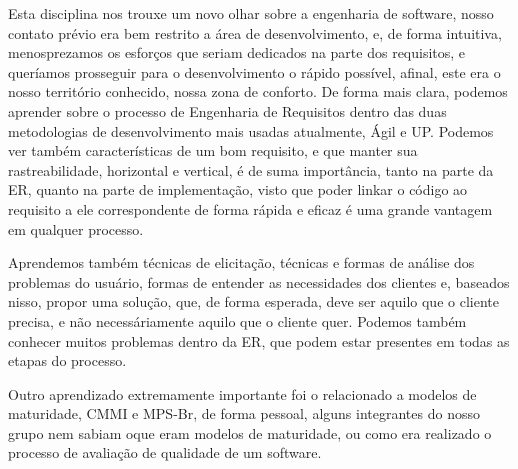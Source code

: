 Esta disciplina nos trouxe um novo olhar sobre a engenharia de software,
nosso contato prévio era bem restrito a área de desenvolvimento, e, de forma intuitiva, menosprezamos os esforços
que seriam dedicados na parte dos requisitos, e queríamos prosseguir para o desenvolvimento o rápido possível,
afinal, este era o nosso território conhecido, nossa zona de conforto.
De forma mais clara, podemos aprender sobre o processo de Engenharia de Requisitos dentro das duas metodologias
de desenvolvimento mais usadas atualmente, Ágil e UP.
Podemos ver também características de um bom requisito, e que manter sua rastreabilidade, horizontal e vertical,
é de suma importância, tanto na parte da ER, quanto na parte de implementação, visto que poder linkar o código
ao requisito a ele correspondente de forma rápida e eficaz é uma grande vantagem em qualquer processo.

Aprendemos também técnicas de elicitação, técnicas e formas de análise dos problemas do usuário,
formas de entender as necessidades dos clientes e, baseados nisso, propor uma solução, que, de forma esperada,
deve ser aquilo que o cliente precisa, e não necessáriamente aquilo que o cliente quer.
Podemos também conhecer muitos problemas dentro da ER, que podem estar presentes em todas as etapas do processo.

Outro aprendizado extremamente importante foi o relacionado a modelos de maturidade, CMMI e MPS-Br, de forma pessoal,
alguns integrantes do nosso grupo nem sabiam oque eram modelos de maturidade, ou como era realizado o processo de
avaliação de qualidade de um software.
